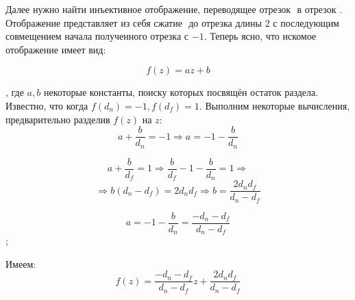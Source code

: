    Далее нужно найти инъективное отображение, переводящее отрезок \begin{math}[d_n, d_f]\end{math} в отрезок \begin{math}[-1, 1]\end{math}. 
   Отображение представляет из себя сжатие \begin{math}[d_n, d_f]\end{math} до отрезка длины \begin{math}2\end{math} с последующим совмещением начала полученного отрезка с \begin{math}-1\end{math}. Теперь ясно, что искомое отображение имеет вид:

   \begin{equation}f(z) = az + b\end{equation}

   , где \begin{math}a, b\end{math} некоторые константы, поиску которых посвящён остаток раздела.
   Известно, что когда \begin{math}f(d_n) = -1, f(d_f) = 1\end{math}. Выполним некоторые вычисления, предварительно разделив 
   \begin{math}f(z)\end{math} на \begin{math}z\end{math}:
   \begin{equation}a + \frac{b}{d_n} = -1 \Rightarrow a = -1 -\frac{b}{d_n} \end{equation}
                                                                             
  
\begin{equation} a + \frac{b}{d_f} = 1 \Rightarrow \frac{b}{d_f} - 1 - \frac{b}{d_n} = 1 \Rightarrow \end{equation}
   \begin{equation}\Rightarrow b(d_n - d_f) = 2d_n d_f \Rightarrow b = \frac{2d_n d_f}{d_n - d_f}\end{equation}

   \begin{equation}a = -1 - \frac{b}{d_n}  = \frac{-d_n - d_f}{d_n - d_f} \end{equation};

   Имеем:
   \begin{equation}f(z) = \frac{-d_n - d_f}{d_n - d_f}z + \frac{2d_n d_f}{d_n - d_f}\end{equation}


